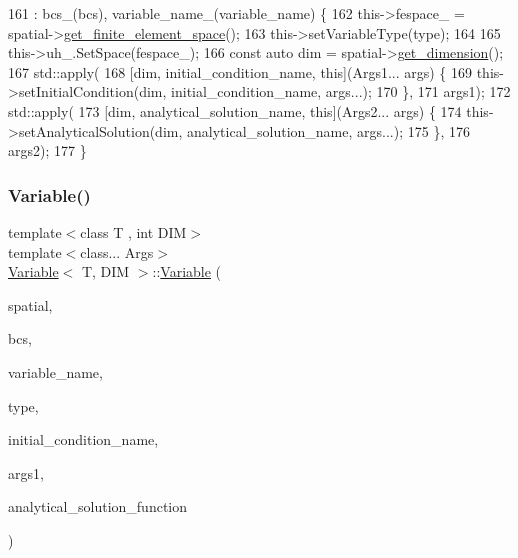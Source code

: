 \begin{DoxyCode}
161     : bcs\_(bcs), variable\_name\_(variable\_name) \{
162   this->fespace\_ = spatial->\hyperlink{classSpatialDiscretization_ac001fc2ff356fe8c0c2b49618e594a03}{get\_finite\_element\_space}();
163   this->setVariableType(type);
164 
165   this->uh\_.SetSpace(fespace\_);
166   \textcolor{keyword}{const} \textcolor{keyword}{auto} dim = spatial->\hyperlink{classSpatialDiscretization_a8d69dd3c7e36327396e626b27d98f96f}{get\_dimension}();
167   std::apply(
168       [dim, initial\_condition\_name, \textcolor{keyword}{this}](Args1... args) \{
169         this->setInitialCondition(dim, initial\_condition\_name, args...);
170       \},
171       args1);
172   std::apply(
173       [dim, analytical\_solution\_name, \textcolor{keyword}{this}](Args2... args) \{
174         this->setAnalyticalSolution(dim, analytical\_solution\_name, args...);
175       \},
176       args2);
177 \}
\end{DoxyCode}
\mbox{\label{classVariable_a711ed81807391502c93317c83e18b112}} 
\subsubsection{\texorpdfstring{Variable()}{Variable()}\hspace{0.1cm}{\footnotesize\ttfamily [3/9]}}
{\footnotesize\ttfamily template$<$class T , int D\+IM$>$ \\
template$<$class... Args$>$ \\
\hyperlink{classVariable}{Variable}$<$ T, D\+IM $>$\+::\hyperlink{classVariable}{Variable} (\begin{DoxyParamCaption}\item[{\hyperlink{classSpatialDiscretization}{Spatial\+Discretization}$<$ T, D\+IM $>$ $\ast$}]{spatial,  }\item[{const \hyperlink{classBoundaryConditions}{Boundary\+Conditions}$<$ T, D\+IM $>$ \&}]{bcs,  }\item[{const std\+::string \&}]{variable\+\_\+name,  }\item[{const std\+::string \&}]{type,  }\item[{const std\+::string \&}]{initial\+\_\+condition\+\_\+name,  }\item[{std\+::tuple$<$ Args... $>$}]{args1,  }\item[{const mfem\+::\+Function\+Coefficient \&}]{analytical\+\_\+solution\+\_\+function }\end{DoxyParamCaption})}



